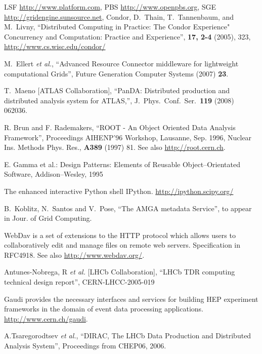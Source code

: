 \documentclass{elsart}
\begin{document}
\begin{thebibliography}{00}

  LSF \url{http://www.platform.com}, PBS \url{http://www.openpbs.org}, SGE
  \url{http://gridengine.sunsource.net}, Condor, D.~Thain, T.~Tannenbaum, and
  M.~Livny, ``Distributed Computing in Practice: The Condor Experience"
  Concurrency and Computation: Practice and Experience'', {\bf 17, 2-4}
  (2005), 323, \url{http://www.cs.wisc.edu/condor/}


  M.~Ellert {\it et al.}, ``Advanced Resource Connector middleware for
  lightweight computational Grids'', Future Generation Computer Systems
  (2007) {\bf23}.
  
 T.~Maeno [ATLAS Collaboration], ``PanDA: Distributed production and distributed analysis system for
ATLAS,'', J.\ Phys.\ Conf.\ Ser.\  {\bf 119} (2008) 062036.

  R. Brun and F. Rademakers, ``ROOT - An Object Oriented Data Analysis
  Framework'', Proceedings AIHENP'96 Workshop, Lausanne, Sep. 1996, Nuclear
  Ins. Methods Phys. Res., {\bf A389} (1997) 81. See also
  \url{http://root.cern.ch}.

  E. Gamma et al.: Design Patterns: Elements of Reusable Object--Orientated Software, 
  Addison--Wesley, 1995

 The enhanced interactive Python shell IPython.
  \url{http://ipython.scipy.org/}

 B.~Koblitz, N.~Santos and V.~Pose, ``The AMGA metadata
  Service'', to appear in Jour. of Grid Computing.

 WebDav is a set of extensions to the HTTP protocol which
  allows users to collaboratively edit and manage files on remote web servers.
  Specification in RFC4918. See also \url{http://www.webdav.org/}.


    Antunes-Nobrega, R {\it et al.} [LHCb Collaboration],
  ``LHCb TDR computing technical design report'', CERN-LHCC-2005-019

  Gaudi provides the necessary interfaces and services for building HEP
  experiment frameworks in the domain of event data processing
  applications. \url{http://www.cern.ch/gaudi}.

  A.Tsaregorodtsev {\it et al.}, ``DIRAC, The LHCb Data Production and
  Distributed Analysis System'', Proceedings from CHEP06, 2006.


\end{thebibliography}
\end{document}
